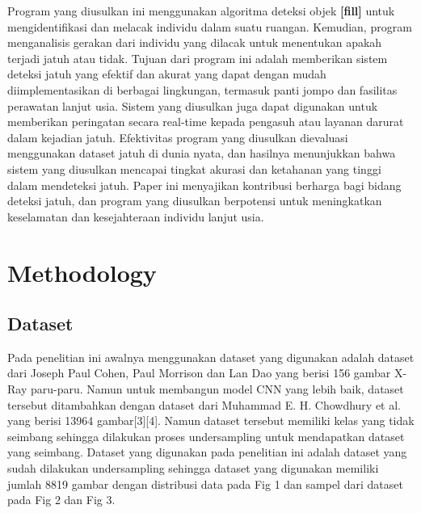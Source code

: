 \documentclass[conference]{IEEEtran}
\begin{document}
Program yang diusulkan ini menggunakan algoritma deteksi objek \textbf{[fill]} untuk mengidentifikasi dan melacak individu dalam suatu ruangan. Kemudian, program menganalisis gerakan dari individu yang dilacak untuk menentukan apakah terjadi jatuh atau tidak. Tujuan dari program ini adalah memberikan sistem deteksi jatuh yang efektif dan akurat yang dapat dengan mudah diimplementasikan di berbagai lingkungan, termasuk panti jompo dan fasilitas perawatan lanjut usia. Sistem yang diusulkan juga dapat digunakan untuk memberikan peringatan secara real-time kepada pengasuh atau layanan darurat dalam kejadian jatuh. Efektivitas program yang diusulkan dievaluasi menggunakan dataset jatuh di dunia nyata, dan hasilnya menunjukkan bahwa sistem yang diusulkan mencapai tingkat akurasi dan ketahanan yang tinggi dalam mendeteksi jatuh. Paper ini menyajikan kontribusi berharga bagi bidang deteksi jatuh, dan program yang diusulkan berpotensi untuk meningkatkan keselamatan dan kesejahteraan individu lanjut usia.

\section{Methodology}

\subsection{Dataset}
Pada penelitian ini awalnya menggunakan dataset yang digunakan adalah dataset dari Joseph Paul Cohen, Paul Morrison dan Lan Dao yang berisi 156 gambar X-Ray paru-paru. Namun untuk membangun model CNN yang lebih baik, dataset tersebut ditambahkan dengan dataset dari Muhammad E. H. Chowdhury et al. yang berisi 13964 gambar[3][4]. Namun dataset tersebut memiliki kelas yang tidak seimbang sehingga dilakukan proses undersampling untuk mendapatkan dataset yang seimbang. Dataset yang digunakan pada penelitian ini adalah dataset yang sudah dilakukan undersampling sehingga dataset yang digunakan memiliki jumlah 8819 gambar dengan distribusi data pada Fig 1 dan sampel dari dataset pada Fig 2 dan Fig 3.
\end{document}
